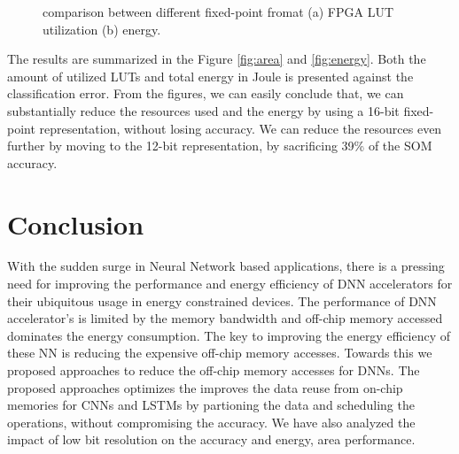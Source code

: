 \documentclass[a4paper,10pt]{article}
\begin{document}
\begin{figure}[!htb]
	\centering
	\hfil
	\caption{comparison between different fixed-point fromat (a) FPGA LUT utilization (b) energy.}
	\label{fig:metrics}
\end{figure}

The results are summarized in the Figure \ref{fig:area} and \ref{fig:energy}. Both the amount of utilized LUTs and total energy in Joule is presented against the classification error. From the figures, we can easily conclude that, we can substantially reduce the resources used and the energy by using a 16-bit fixed-point representation, without losing accuracy. We can reduce the resources even further by moving to the 12-bit representation, by sacrificing 39\% of the SOM accuracy. 

\section{Conclusion}
With the sudden surge in Neural Network based applications, there is a pressing need for improving the performance and energy efficiency of DNN accelerators for their ubiquitous usage in energy constrained devices. The performance of DNN accelerator's is limited by the memory bandwidth and off-chip memory accessed dominates the energy consumption. The key to improving the energy efficiency of these NN is reducing the expensive off-chip memory accesses. Towards this we proposed approaches to reduce the off-chip memory accesses for DNNs. The proposed approaches optimizes the improves the data reuse from on-chip memories for CNNs and LSTMs by partioning the data and scheduling the operations, without compromising the accuracy. We have also analyzed the impact of low bit resolution on the accuracy and energy, area performance. 

\footnotesize

\end{document}
